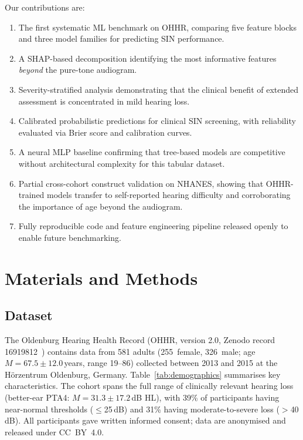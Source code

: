 \documentclass[conference]{IEEEtran}
\begin{document}
Our contributions are:
\begin{enumerate}
  \item The first systematic ML benchmark on OHHR, comparing five feature
        blocks and three model families for predicting SIN performance.
  \item A SHAP-based decomposition identifying the most informative features
        \emph{beyond} the pure-tone audiogram.
  \item Severity-stratified analysis demonstrating that the clinical benefit
        of extended assessment is concentrated in mild hearing loss.
  \item Calibrated probabilistic predictions for clinical SIN screening,
        with reliability evaluated via Brier score and calibration curves.
  \item A neural MLP baseline confirming that tree-based models are competitive
        without architectural complexity for this tabular dataset.
  \item Partial cross-cohort construct validation on NHANES, showing that
        OHHR-trained models transfer to self-reported hearing difficulty and
        corroborating the importance of age beyond the audiogram.
  \item Fully reproducible code and feature engineering pipeline released
        openly to enable future benchmarking.
\end{enumerate}

\section{Materials and Methods}

\subsection{Dataset}

The Oldenburg Hearing Health Record (OHHR, version 2.0, Zenodo record
16919812~\cite{OHHR2025}) contains data from 581 adults (255~female,
326~male; age $M=67.5\pm12.0$\,years, range 19--86) collected between 2013
and 2015 at the Hörzentrum Oldenburg, Germany.  Table~\ref{tab:demographics}
summarises key characteristics.  The cohort spans the full range of
clinically relevant hearing loss (better-ear PTA4: $M=31.3\pm17.2$\,dB
HL), with 39\% of participants having near-normal thresholds ($\leq$25\,dB)
and 31\% having moderate-to-severe loss ($>$40\,dB).  All participants
gave written informed consent; data are anonymised and released under
CC~BY~4.0.
\end{document}
